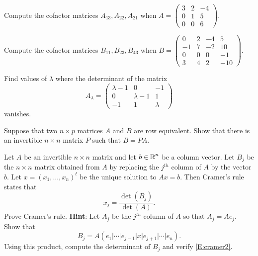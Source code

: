 \documentclass{ximera}
\begin{document}
\begin{exercise} \label{c10.1.b7a}
Compute the cofactor matrices $A_{13}, A_{22}, A_{21}$ when 
$A = \left( \begin{array}{rrr}
 3 & 2 & -4\\
 0 & 1 & 5\\
 0 & 0 & 6\end{array} \right)$.
\end{exercise}
\begin{exercise} \label{c10.1.b7b}
Compute the cofactor matrices $B_{11}, B_{23}, B_{43}$ when
$B = \left( \begin{array}{rrrr}
 0 & 2 & -4 & 5\\
 -1 & 7 & -2 & 10\\
 0 & 0 & 0  & -1\\
3 & 4 & 2 & -10
\end{array} \right)$.
\end{exercise}

\begin{exercise} \label{c10.1.c7}
Find values of $\lambda$ where the determinant of the matrix
\[
A_\lambda = \left( \begin{array}{ccr}
 \lambda -1 & 0 & -1\\
 0 & \lambda -1 & 1\\
-1 & 1 & \lambda 
\end{array} \right)
\]
vanishes.  
\end{exercise}

\begin{exercise}  \label{c10.1.c8} 
Suppose that two $n\times p$ matrices $A$ and $B$ are row
equivalent.  Show that there is an invertible
$n\times n$ matrix $P$ such that $B = PA$.
\end{exercise}

\begin{exercise} \label{c10.1.c9}
Let $A$ be an invertible $n\times n$ matrix and let $b\in\mbox{$\Bbb{R}$}^n$ be a column 
vector. Let $B_j$ be the $n\times n$ matrix obtained from $A$ by replacing the 
$j^{th}$ column of $A$ by the vector $b$.  Let $x=(x_1,\ldots,x_n)^t$ be the 
unique solution to $Ax=b$. Then Cramer's rule  states that
\begin{equation}  \label{E:cramer2}
x_j = \frac{\det(B_j)}{\det(A)}.
\end{equation}
Prove Cramer's rule.  {\bf Hint}: Let $A_j$ be the $j^{th}$ column of $A$ so
that $A_j = Ae_j$.  Show that 
\[
B_j = A (e_1|\cdots|e_{j-1}|x|e_{j+1}|\cdots|e_n).
\]
Using this product, compute the determinant of $B_j$ and verify \eqref{E:cramer2}.
\end{exercise}
\end{document}
